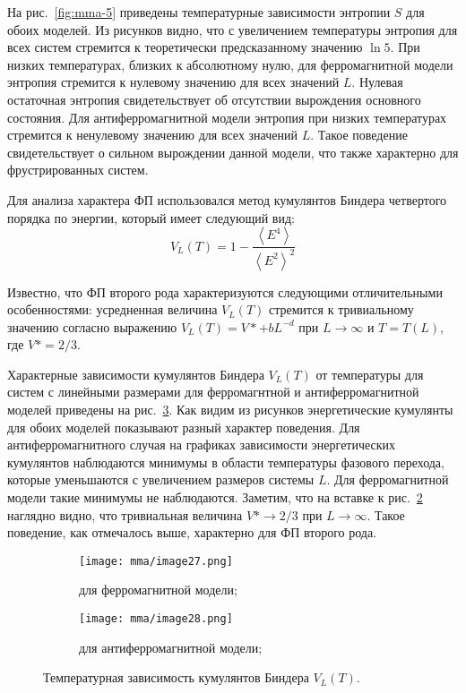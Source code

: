 На рис.~\ref{fig:mma-5} приведены температурные зависимости энтропии $S$ для обоих моделей. Из рисунков видно, что с увеличением температуры энтропия для всех систем стремится к теоретически предсказанному значению $\ln 5$. При низких температурах, близких к абсолютному нулю, для ферромагнитной модели энтропия стремится к нулевому значению для всех значений $L$. Нулевая остаточная энтропия свидетельствует об отсутствии вырождения основного состояния. Для антиферромагнитной модели энтропия при низких температурах стремится к ненулевому значению для всех значений $L$. Такое поведение свидетельствует о сильном вырождении данной модели, что также характерно для фрустрированных систем.

Для анализа характера ФП использовался метод кумулянтов Биндера четвертого порядка по энергии, который имеет следующий вид:
\begin{equation*}
    V_L (T) = 1 - \frac{\left<E^4\right>}{\left<E^2\right>^2}
\end{equation*}

Известно, что ФП второго рода характеризуются следующими отличительными особенностями: усредненная величина $V_L (T)$ стремится к тривиальному значению согласно выражению $V_L (T) = V* + b L^{-d}$ при $L \to \infty$ и $T = T(L)$, где $V* = 2/3$.

Характерные зависимости кумулянтов Биндера $V_L(T)$ от температуры для систем с линейными размерами для ферромагнтной и антиферромагнитной моделей приведены на рис.~\ref{fig:mma-6}. Как видим из рисунков энергетические кумулянты для обоих моделей показывают разный характер поведения. Для антиферромагнитного случая на графиках зависимости энергетических кумулянтов наблюдаются минимумы в области температуры фазового перехода, которые уменьшаются с увеличением размеров системы $L$. Для ферромагнитной модели такие минимумы не наблюдаются. Заметим, что на вставке к рис.~\ref{fig:mma-6b} наглядно видно, что тривиальная величина $V* \to 2/3$ при $L \to \infty$. Такое поведение, как отмечалось выше, характерно для ФП второго рода.
\begin{figure}[ht]
    \centering
    \begin{subfigure}{0.45\textwidth}
        \texttt{[image: mma/image27.png]}
        \caption{для ферромагнитной модели;}
        \label{fig:mma-6a}
    \end{subfigure}
    \begin{subfigure}{0.45\textwidth}
        \texttt{[image: mma/image28.png]}
        \caption{для антиферромагнитной модели;}
        \label{fig:mma-6b}
    \end{subfigure}
    \caption{Температурная зависимость кумулянтов Биндера $V_L (T)$.}
    \label{fig:mma-6}
\end{figure}

